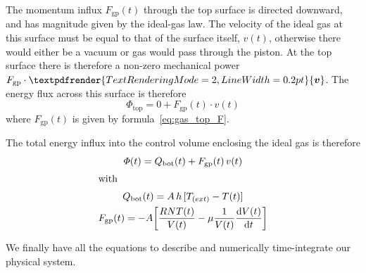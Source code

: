 \documentclass[a4paper,12pt,%
onecolumn,oneside,%
british%
]{memoir}
\renewcommand*{\bm}[1]{\textpdfrender{TextRenderingMode=2,LineWidth=0.2pt}{\boldsymbol{#1}}}
\newcommand*{\di}{\mathrm{d}}%
\renewcommand*{\|}[1][]{\nonscript\:#1\vert\nonscript\:\mathopen{}}
\newcommand*{\yvis}{\mu} %
\newcommand*{\yhea}{h} %
\newcommand*{\yv}{\bm{v}}
\newcommand*{\yN}{N}
\newcommand*{\yH}{\varPhi}%
\newcommand*{\yQb}{Q_{\text{bot}}}%
\newcommand*{\yFgp}{F_{\text{gp}}}
\newcommand*{\ypr}{p} %
\newcommand*{\yT}{T}%
\newcommand*{\yTe}{\yT_{\text(ext)}}%
\begin{document}
\begin{description}
  The momentum influx $\yFgp(t)$ through the top surface is directed downward, and has magnitude given by the ideal-gas law. The velocity of the ideal gas at this surface must be equal to that of the surface itself, $v(t)$, otherwise there would either be a vacuum or gas would pass through the piston. At the top surface there is therefore a non-zero mechanical power $\yFgp\cdot\yv$. The energy flux across this surface is therefore
  \begin{equation*}
    \yH_{\text{top}} = 0 + \yFgp(t)\cdot v(t)
  \end{equation*}
where $\yFgp(t)$ is given by formula~\eqref{eq:gas_top_F}.
\end{description}

The total energy influx into the control volume enclosing the ideal gas is therefore
\begin{equation}
  \label{eq:gas_energy_influx}
  \begin{gathered}
    \yH(t) = \yQb(t) + \yFgp(t) \,v(t)
    \\[\jot]\text{with}\hfill
    \\[\jot]
    \yQb(t) = A\,\yhea\,[\yTe-\yT(t)]
    \\
    \yFgp(t) = -A\biggl[\frac{R \yN \yT(t)}{V(t)}  -\yvis \frac{1}{V(t)}\frac{\di V(t)}{\di t}\biggr]
  \end{gathered}
\end{equation}

We finally have all the equations to describe and numerically time-integrate our physical system.
\end{document}
